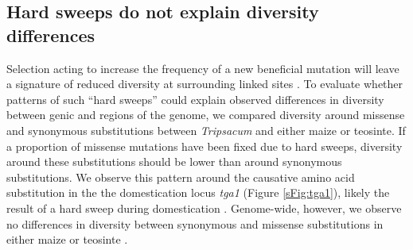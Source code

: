 \documentclass{pnastwo}
\begin{document}
\begin{article}
\subsection{Hard sweeps do not explain diversity differences} Selection acting to increase the frequency of a new beneficial mutation will leave a signature of reduced diversity at surrounding linked sites \cite{smith1974}.
To evaluate whether patterns of such ``hard sweeps'' could explain observed differences in diversity between genic and \DIFdelbegin {}\DIFdelend \DIFaddbegin {}\DIFaddend regions of the genome, we compared diversity around missense and synonymous substitutions between \emph{Tripsacum} and either maize or teosinte\DIFdelbegin {}\DIFdelend .
If a proportion of missense mutations have been fixed due to hard sweeps, diversity around these substitutions should be lower than around synonymous substitutions. 
We observe this pattern around the causative amino acid substitution in the the domestication locus \emph{tga1} (Figure \ref{sFig:tga1}), likely the result of a hard sweep during domestication \cite{wang2005origin, wang2015}.
Genome-wide, however, we observe no differences in diversity between synonymous and missense substitutions in either maize or teosinte \DIFaddbegin {}\DIFaddend .


\end{article}
\end{document}

